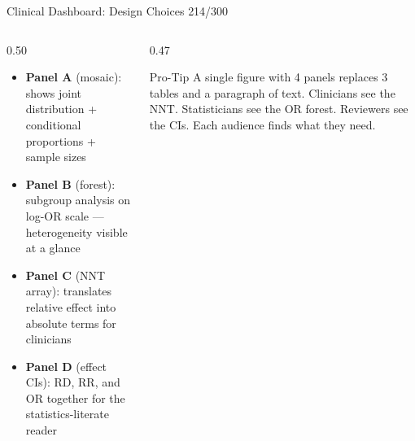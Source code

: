 \documentclass[10pt]{beamer}
\newcommand{\smark}[1]{\hfill{\scriptsize\color{codegray}#1}}
\begin{document}
\begin{frame}{Clinical Dashboard: Design Choices}
\smark{214/300}
\begin{columns}[T]
\begin{column}{0.50\textwidth}
\begin{itemize}
    \item \textbf{Panel A} (mosaic): shows joint distribution + conditional proportions + sample sizes
    \item \textbf{Panel B} (forest): subgroup analysis on log-OR scale --- heterogeneity visible at a glance
    \item \textbf{Panel C} (NNT array): translates relative effect into absolute terms for clinicians
    \item \textbf{Panel D} (effect CIs): RD, RR, and OR together for the statistics-literate reader
\end{itemize}
\end{column}
\begin{column}{0.47\textwidth}
\begin{alertblock}{Pro-Tip}
    \scriptsize A single figure with 4 panels replaces 3 tables and a paragraph of text. Clinicians see the NNT. Statisticians see the OR forest. Reviewers see the CIs. Each audience finds what they need.
\end{alertblock}
\end{column}
\end{columns}
\end{frame}
\end{document}
